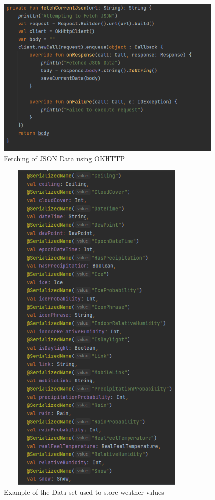 \begin{figure}[H]
    \centering
    \includegraphics[width=12cm,height = 8cm]{img/DataFetch.PNG}
    \caption{Fetching of JSON Data using OKHTTP}
    \label{fig:altas config}
\end{figure}

\begin{figure}[H]
    \centering
    \includegraphics[width=10cm,height = 17cm]{img/DataExample.PNG}
    \caption{Example of the Data set used to store weather values}
    \label{fig:altas config}
\end{figure}

